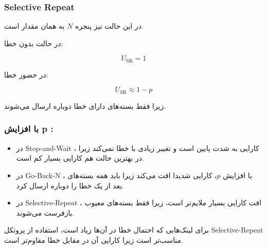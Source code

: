 {\subsubsection*{Selective Repeat}
در این حالت نیز پنجره $N$ به همان مقدار است.

در حالت بدون خطا:

\[
U_{\text{SR}} = 1
\]

در حضور خطا:

\[
U_{\text{SR}} \approx 1 - p
\]

زیرا فقط بسته‌های دارای خطا دوباره ارسال می‌شوند.

\subsubsection*{با افزایش p :}
\begin{itemize}
    \item در {Stop-and-Wait} ، کارایی به شدت پایین است و تغییر زیادی با خطا نمی‌کند زیرا در بهترین حالت هم کارایی بسیار کم است.
    \item در {Go-Back-N} ، با افزایش $p$، کارایی شدیدا افت می‌کند زیرا باید همه بسته‌های بعد از یک خطا را دوباره ارسال کرد.
    \item در {Selective-Repeat} ، افت کارایی بسیار ملایم‌تر است، زیرا فقط بسته‌های معیوب بازفرست می‌شوند.
\end{itemize}

برای لینک‌هایی که احتمال خطا در آن‌ها زیاد است، استفاده از پروتکل {Selective-Repeat} مناسب‌تر است زیرا کارایی آن در مقابل خطا مقاوم‌تر است.


}

